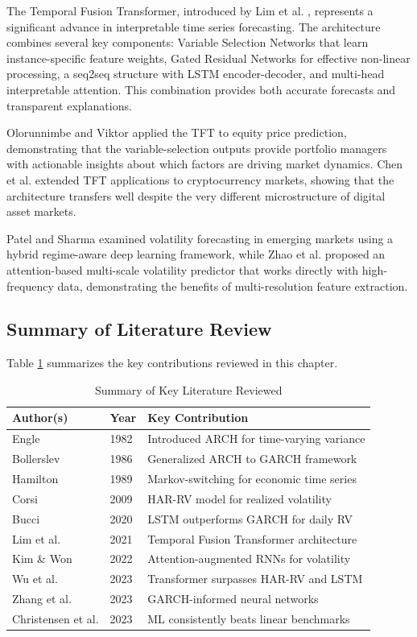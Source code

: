 The Temporal Fusion Transformer, introduced by Lim et al. \cite{lim2021}, represents a significant advance in interpretable time series forecasting. The architecture combines several key components: Variable Selection Networks that learn instance-specific feature weights, Gated Residual Networks for effective non-linear processing, a seq2seq structure with LSTM encoder-decoder, and multi-head interpretable attention. This combination provides both accurate forecasts and transparent explanations.

Olorunnimbe and Viktor \cite{olorunnimbe2023} applied the TFT to equity price prediction, demonstrating that the variable-selection outputs provide portfolio managers with actionable insights about which factors are driving market dynamics. Chen et al. \cite{chen2024} extended TFT applications to cryptocurrency markets, showing that the architecture transfers well despite the very different microstructure of digital asset markets.

Patel and Sharma \cite{patel2024} examined volatility forecasting in emerging markets using a hybrid regime-aware deep learning framework, while Zhao et al. \cite{zhao2024} proposed an attention-based multi-scale volatility predictor that works directly with high-frequency data, demonstrating the benefits of multi-resolution feature extraction.

\subsection{Summary of Literature Review}

Table \ref{tab:litreview} summarizes the key contributions reviewed in this chapter.

\begin{table}[h!]
\caption{Summary of Key Literature Reviewed}
\label{tab:litreview}
\centering
\small
\begin{tabular}{p{3.5cm}p{2cm}p{6cm}}
\hline
\textbf{Author(s)} & \textbf{Year} & \textbf{Key Contribution} \\
\hline
Engle & 1982 & Introduced ARCH for time-varying variance \\
Bollerslev & 1986 & Generalized ARCH to GARCH framework \\
Hamilton & 1989 & Markov-switching for economic time series \\
Corsi & 2009 & HAR-RV model for realized volatility \\
Bucci & 2020 & LSTM outperforms GARCH for daily RV \\
Lim et al. & 2021 & Temporal Fusion Transformer architecture \\
Kim \& Won & 2022 & Attention-augmented RNNs for volatility \\
Wu et al. & 2023 & Transformer surpasses HAR-RV and LSTM \\
Zhang et al. & 2023 & GARCH-informed neural networks \\
Christensen et al. & 2023 & ML consistently beats linear benchmarks \\
\hline
\end{tabular}
\end{table}

